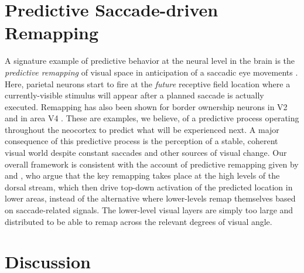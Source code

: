 \documentclass[11pt,twoside]{article}
\newif\myifpdf
\begin{document}
\section{Predictive Saccade-driven Remapping}

A signature example of predictive behavior at the neural level in the brain is the {\em predictive remapping} of visual space in anticipation of a saccadic eye movements \cite{DuhamelColbyGoldberg92,ColbyDuhamelGoldberg97,GottliebKusunokiGoldberg98,NakamuraColby02,MarinoMazer16}.  Here, parietal neurons start to fire at the {\em future} receptive field location where a currently-visible stimulus will appear after a planned saccade is actually executed. Remapping has also been shown for border ownership neurons in V2 \cite{OHerronvonderHeydt13} and in area V4 \cite{NeupaneGuittonPack16}. These are examples, we believe, of a predictive process operating throughout the neocortex to predict what will be experienced next.  A major consequence of this predictive process is the perception of a stable, coherent visual world despite constant saccades and other sources of visual change.  Our overall framework is consistent with the account of predictive remapping given by  and , who argue that the key remapping takes place at the high levels of the dorsal stream, which then drive top-down activation of the predicted location in lower areas, instead of the alternative where lower-levels remap themselves based on saccade-related signals.  The lower-level visual layers are simply too large and distributed to be able to remap across the relevant degrees of visual angle.


\section{Discussion}
\end{document}

